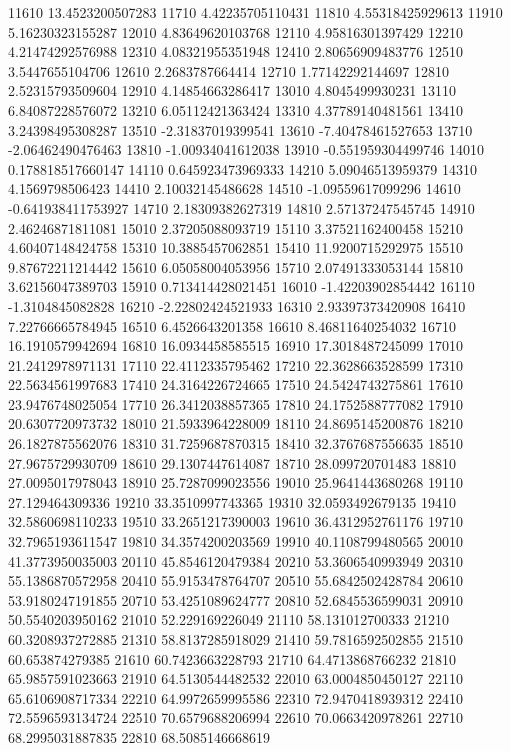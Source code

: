 {11610 13.4523200507283
11710 4.42235705110431
11810 4.55318425929613
11910 5.16230323155287
12010 4.83649620103768
12110 4.95816301397429
12210 4.21474292576988
12310 4.08321955351948
12410 2.80656909483776
12510 3.5447655104706
12610 2.2683787664414
12710 1.77142292144697
12810 2.52315793509604
12910 4.14854663286417
13010 4.8045499930231
13110 6.84087228576072
13210 6.05112421363424
13310 4.37789140481561
13410 3.24398495308287
13510 -2.31837019399541
13610 -7.40478461527653
13710 -2.06462490476463
13810 -1.00934041612038
13910 -0.551959304499746
14010 0.178818517660147
14110 0.645923473969333
14210 5.09046513959379
14310 4.1569798506423
14410 2.10032145486628
14510 -1.09559617099296
14610 -0.641938411753927
14710 2.18309382627319
14810 2.57137247545745
14910 2.46246871811081
15010 2.37205088093719
15110 3.37521162400458
15210 4.60407148424758
15310 10.3885457062851
15410 11.9200715292975
15510 9.87672211214442
15610 6.05058004053956
15710 2.07491333053144
15810 3.62156047389703
15910 0.713414428021451
16010 -1.42203902854442
16110 -1.3104845082828
16210 -2.22802424521933
16310 2.93397373420908
16410 7.22766665784945
16510 6.4526643201358
16610 8.46811640254032
16710 16.1910579942694
16810 16.0934458585515
16910 17.3018487245099
17010 21.2412978971131
17110 22.4112335795462
17210 22.3628663528599
17310 22.5634561997683
17410 24.3164226724665
17510 24.5424743275861
17610 23.9476748025054
17710 26.3412038857365
17810 24.1752588777082
17910 20.6307720973732
18010 21.5933964228009
18110 24.8695145200876
18210 26.1827875562076
18310 31.7259687870315
18410 32.3767687556635
18510 27.9675729930709
18610 29.1307447614087
18710 28.099720701483
18810 27.0095017978043
18910 25.7287099023556
19010 25.9641443680268
19110 27.129464309336
19210 33.3510997743365
19310 32.0593492679135
19410 32.5860698110233
19510 33.2651217390003
19610 36.4312952761176
19710 32.7965193611547
19810 34.3574200203569
19910 40.1108799480565
20010 41.3773950035003
20110 45.8546120479384
20210 53.3606540993949
20310 55.1386870572958
20410 55.9153478764707
20510 55.6842502428784
20610 53.9180247191855
20710 53.4251089624777
20810 52.6845536599031
20910 50.5540203950162
21010 52.229169226049
21110 58.131012700333
21210 60.3208937272885
21310 58.8137285918029
21410 59.7816592502855
21510 60.653874279385
21610 60.7423663228793
21710 64.4713868766232
21810 65.9857591023663
21910 64.5130544482532
22010 63.0004850450127
22110 65.6106908717334
22210 64.9972659995586
22310 72.9470418939312
22410 72.5596593134724
22510 70.6579688206994
22610 70.0663420978261
22710 68.2995031887835
22810 68.5085146668619
}
